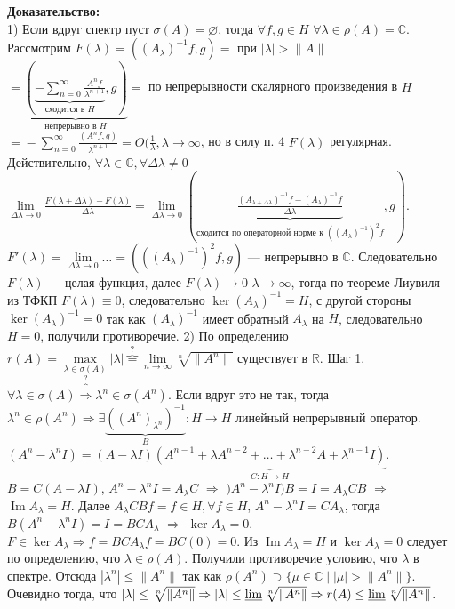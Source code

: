 \documentclass[12pt]{article}
\DeclareMathOperator{\Imm}{Im}
\newcommand{\Al}{A_\lambda}
\newcommand{\Alo}{(\Al)^{-1}}
\begin{document}
\textbf{Доказательство:}\\
1) Если вдруг спектр пуст $\sigma(A) = \varnothing$, тогда $\forall f, g \in H$ $\forall \lambda \in  \rho(A) = \mathbb C$.
Рассмотрим $F(\lambda) = (\Alo f, g) \boxed{=}$ при $|\lambda| > \|A\|$ $\boxed{=} \underbrace{(\underbrace{-\sum_{n = 0}^{\infty}
\frac{A^n f}{\lambda^{n + 1}}}_{\text{сходится в $H$}}, g)}_{\text{непрерывно в $H$}} \boxed{=}$ по непрерывности скалярного произведения в $H$ $\boxed{=}
-\sum_{n = 0}^{\infty} \frac{(A^n f, g)}{\lambda^{n + 1}} = O(\frac{1}{\lambda}, \lambda \to \infty$, но в силу п. 4 $F(\lambda)$ регулярная.
Действительно, $\forall \lambda \in \mathbb C, \forall \Delta\lambda \ne 0$ $\lim\limits_{\Delta\lambda \to 0} \frac{F(\lambda + \Delta\lambda) - F(\lambda)}
{\Delta\lambda} = \lim\limits_{\Delta\lambda \to 0} (\underbrace{\frac{(A_{\lambda + \Delta\lambda})^{-1}f - \Alo f}{\Delta\lambda}}_{\text{сходится по операторной
норме к $(\Alo)^2 f$}}, g)$.
$F'(\lambda) = \lim\limits_{\Delta\lambda \to 0} \dots = ((\Alo)^2 f, g)$ --- непрерывно в $\mathbb C$.
Следовательно $F(\lambda)$ --- целая функция, далее $F(\lambda) \to 0$ $\lambda \to \infty$, тогда по теореме Лиувиля из ТФКП $F(\lambda) \equiv 0$,
следовательно $\ker \Alo = H$, с другой стороны $\ker \Alo = 0$ так как $\Alo$ имеет обратный $\Al$ на $H$, следовательно $H = 0$, получили противоречие.
2) По определению $r(A) = \max\limits_{\lambda \in \sigma(A)} |\lambda| \overbrace{=}^{?} \lim \limits_{n \to \infty} \sqrt[n]{\|A^n\|}$ существует в $\mathbb R$.
Шаг 1.
$\forall \lambda \in \sigma(A) \overbrace{\Rightarrow}^{?} \lambda^n \in \sigma(A^n)$. 
Если вдруг это не так, тогда $\lambda^n \in \rho(A^n) \Rightarrow \exists \underbrace{((A^n)_{\lambda^n})^{-1}}_{B} : H \to H$ линейный непрерывный оператор.
$(A^n - \lambda^n I) = (A - \lambda I)\underbrace{(A^{n - 1} + \lambda A^{n - 2} + \dots + \lambda^{n - 2} A + \lambda^{n - 1} I)}_{C : H \to H}$.
$B = C(A - \lambda I)$, $A^n - \lambda^n I = \Al C$ $\Rightarrow$ $)A^n - \lambda^n I) B = I = \Al C B$ $\Rightarrow$ $\Imm \Al = H$.
Далее $\Al CBf = f \in H, \forall f \in H$, $A^n - \lambda^n I = C\Al$, тогда $B(A^n - \lambda^n I) = I = B C \Al$ $\Rightarrow$ $\ker \Al = 0$.
$F \in \ker \Al \Rightarrow f = B C \Al f = B C(0) = 0$.
Из $\Imm \Al = H$ и $\ker \Al = 0$ следует по определению, что $\lambda \in \rho(A)$.
Получили противоречие условию, что $\lambda$ в спектре.
Отсюда $|\lambda^n| \le \|A^n\|$ так как $\rho(A^n) \supset \{\mu \in \mathbb C \mid |\mu| > \|A^n\|\}$.
Очевидно тогда, что $|\lambda| \le \sqrt[n]{\|A^n\|} \Rightarrow |\lambda| \le \varliminf \sqrt[n]{\|A^n\|} \Rightarrow r(A) \le \varliminf \sqrt[n]{\|A^n\|}$.
\end{document}
